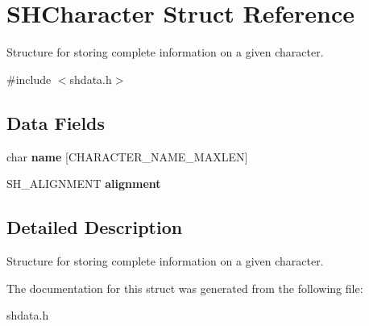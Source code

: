 \hypertarget{struct_s_h_character}{\section{S\-H\-Character Struct Reference}
\label{struct_s_h_character}
}


Structure for storing complete information on a given character.  




{\ttfamily \#include $<$shdata.\-h$>$}

\subsection*{Data Fields}
\begin{DoxyCompactItemize}
\item 
\hypertarget{struct_s_h_character_af32648dfbf041accafffacd983d5b03e}{char {\bfseries name} \mbox{[}C\-H\-A\-R\-A\-C\-T\-E\-R\-\_\-\-N\-A\-M\-E\-\_\-\-M\-A\-X\-L\-E\-N\mbox{]}}\label{struct_s_h_character_af32648dfbf041accafffacd983d5b03e}

\item 
\hypertarget{struct_s_h_character_af4c998088aa2a6381af960d447a5857f}{S\-H\-\_\-\-A\-L\-I\-G\-N\-M\-E\-N\-T {\bfseries alignment}}\label{struct_s_h_character_af4c998088aa2a6381af960d447a5857f}

\end{DoxyCompactItemize}


\subsection{Detailed Description}
Structure for storing complete information on a given character. 

The documentation for this struct was generated from the following file\-:\begin{DoxyCompactItemize}
\item 
shdata.\-h\end{DoxyCompactItemize}

